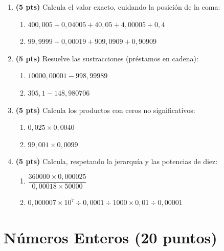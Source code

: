 \documentclass[12pt, letterpaper]{article}
\begin{document}
\begin{enumerate}[leftmargin=*]
  \item \textbf{(5 pts)} Calcula el valor exacto, cuidando la posición de la coma:
        \begin{enumerate}[label=\alph*)]
          \item $400{,}005 + 0{,}04005 + 40{,}05 + 4{,}00005 + 0{,}4$
          \item $99{,}9999 + 0{,}00019 + 909{,}0909 + 0{,}90909$
        \end{enumerate}

  \item \textbf{(5 pts)} Resuelve las sustracciones (préstamos en cadena):
        \begin{enumerate}[label=\alph*)]
          \item $10000{,}00001 - 998{,}99989$
          \item $305{,}1 - 148{,}980706$
        \end{enumerate}

  \item \textbf{(5 pts)} Calcula los productos con ceros no significativos:
        \begin{enumerate}[label=\alph*)]
          \item $0{,}025 \times 0{,}0040$
          \item $99{,}001 \times 0{,}0099$
        \end{enumerate}

  \item \textbf{(5 pts)} Calcula, respetando la jerarquía y las potencias de diez:
        \begin{enumerate}[label=\alph*)]
          \item $\dfrac{360000 \times 0{,}000025}{0{,}00018 \times 50000}$
          \item $0{,}000007 \times 10^7 \div 0{,}0001 \div 1000 \times 0{,}01 \div 0{,}00001$
        \end{enumerate}
\end{enumerate}

\section{Números Enteros (20 puntos)}
\end{document}
